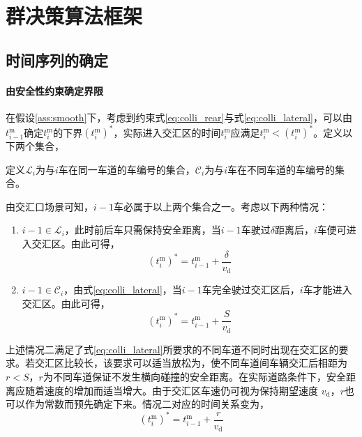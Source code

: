 \section{群决策算法框架}
\subsection{时间序列的确定}
\label{ssec:time_series}
\paragraph{由安全性约束确定界限}
在假设\ref{ass:smooth}下，考虑到约束式\ref{eq:colli_rear}与式\ref{eq:colli_lateral}，可以由$t_{i-1}^\mathrm{m}$确定$t_i^\mathrm{m}$的下界$(t_i^\mathrm{m})^*$，实际进入交汇区的时间$t_i^\mathrm{m}$应满足$t_i^\mathrm{m} < (t_i^\mathrm{m})^*$。定义以下两个集合，
\begin{definition}
定义$\mathcal{L}_i$为与$i$车在同一车道的车编号的集合，$\mathcal{C}_i$为与$i$车在不同车道的车编号的集合。
\end{definition}
由交汇口场景可知，$i-1$车必属于以上两个集合之一。考虑以下两种情况：
\begin{enumerate}[label=(\arabic*)]
\item $i-1\in \mathcal{L}_i$，此时前后车只需保持安全距离，当$i-1$车驶过$\delta$距离后，$i$车便可进入交汇区。由此可得，
\begin{equation}
(t_i^\mathrm{m})^*=t_{i-1}^\mathrm{m} + \frac{\delta}{v_\mathrm{d}}
\label{eq:t_case1}
\end{equation}
\item $i-1\in \mathcal{C}_i$，由式\ref{eq:colli_lateral}，当$i-1$车完全驶过交汇区后，$i$车才能进入交汇区。由此可得，
\begin{equation}
(t_i^\mathrm{m})^*=t_{i-1}^\mathrm{m} + \frac{S}{v_\mathrm{d}}
\label{eq:t_case2}
\end{equation}
\end{enumerate}

上述情况二满足了式\ref{eq:colli_lateral}所要求的不同车道不同时出现在交汇区的要求。若交汇区比较长，该要求可以适当放松为，使不同车道间车辆交汇后相距为 $r < S$，$r$为不同车道保证不发生横向碰撞的安全距离。在实际道路条件下，安全距离应随着速度的增加而适当增大。由于交汇区车速仍可视为保持期望速度 $v_\mathrm{d}$，$r$也可以作为常数而预先确定下来。情况二对应的时间关系变为，
\begin{equation}
(t_i^\mathrm{m})^*=t_{i-1}^\mathrm{m} + \frac{r}{v_\mathrm{d}}
\label{eq:t_case2r}
\end{equation}

